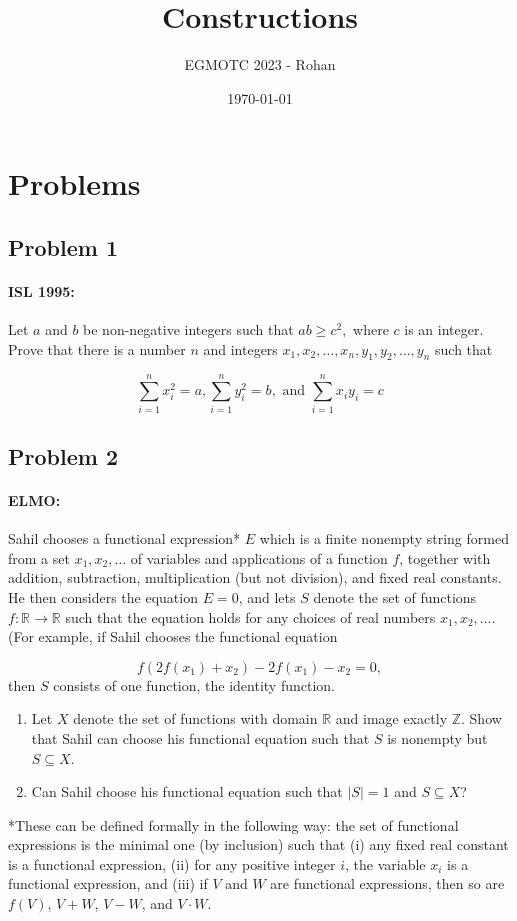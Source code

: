 \documentclass[12pt]{article}
\title{Constructions}
\author{EGMOTC 2023 - Rohan}
\date{\today}
\begin{document}
\maketitle

\newcommand{\localtextbulletone}{\textcolor{black}{\raisebox{.45ex}{\rule{.6ex}{.6ex}}}}
\renewcommand{\labelitemi}{\localtextbulletone}

\newtheorem{definition}{Definition}
\newtheorem{theorem}{Theorem}
\newtheorem{corollary}{Corollary}

\thispagestyle{empty}
\section*{Problems}

\subsection*{Problem 1}
\paragraph*{ISL 1995:}  Let $ a$ and $ b$ be non-negative integers such that $ ab \geq c^2,$ where $ c$ is an integer. Prove that there is a number $ n$ and integers $ x_1, x_2, \ldots, x_n, y_1, y_2, \ldots, y_n$ such that

\[ \sum^n_{i=1} x^2_i = a, \sum^n_{i=1} y^2_i = b, \text{ and } \sum^n_{i=1} x_iy_i = c\] 

\subsection*{Problem 2}
\paragraph*{ELMO:} Sahil chooses a functional expression* $E$ which is a finite nonempty string formed from a set $x_1, x_2, \dots$ of variables and applications of a function $f$, together with addition, subtraction, multiplication (but not division), and fixed real constants. He then considers the equation $E = 0$, and lets $S$ denote the set of functions $f \colon \mathbb R \to \mathbb R$ such that the equation holds for any choices of real numbers $x_1, x_2, \dots$. (For example, if Sahil chooses the functional equation

\[f(2f(x_1)+x_2) - 2f(x_1)-x_2 = 0,\]
then $S$ consists of one function, the identity function.
\begin{enumerate}
    \item Let $X$ denote the set of functions with domain $\mathbb R$ and image exactly $\mathbb Z$. Show that Sahil can choose his functional equation such that $S$ is nonempty but $S \subseteq X$.
    \item Can Sahil choose his functional equation such that $|S|=1$ and $S \subseteq X$?
\end{enumerate}
*These can be defined formally in the following way: the set of functional expressions is the minimal one (by inclusion) such that (i) any fixed real constant is a functional expression, (ii) for any positive integer $i$, the variable $x_i$ is a functional expression, and (iii) if $V$ and $W$ are functional expressions, then so are $f(V)$, $V+W$, $V-W$, and $V \cdot W$.
\end{document}
